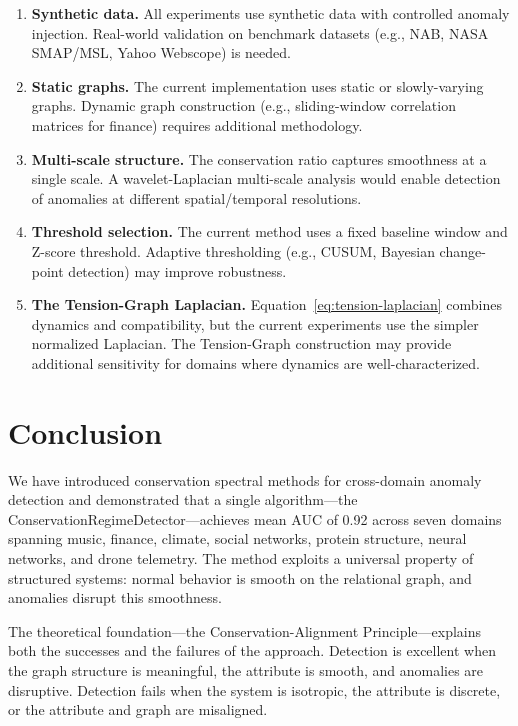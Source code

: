 \documentclass[11pt,a4paper]{article}
\begin{document}
\begin{enumerate}
  \item \textbf{Synthetic data.} All experiments use synthetic data with
        controlled anomaly injection.  Real-world validation on benchmark
        datasets (e.g., NAB, NASA SMAP/MSL, Yahoo Webscope) is needed.
  \item \textbf{Static graphs.} The current implementation uses static or
        slowly-varying graphs.  Dynamic graph construction (e.g., sliding-window
        correlation matrices for finance) requires additional methodology.
  \item \textbf{Multi-scale structure.} The conservation ratio captures smoothness
        at a single scale.  A wavelet-Laplacian multi-scale analysis would
        enable detection of anomalies at different spatial/temporal resolutions.
  \item \textbf{Threshold selection.} The current method uses a fixed baseline
        window and Z-score threshold.  Adaptive thresholding (e.g., CUSUM,
        Bayesian change-point detection) may improve robustness.
  \item \textbf{The Tension-Graph Laplacian.} Equation~\eqref{eq:tension-laplacian}
        combines dynamics and compatibility, but the current experiments use
        the simpler normalized Laplacian.  The Tension-Graph construction may
        provide additional sensitivity for domains where dynamics are well-characterized.
\end{enumerate}

\section{Conclusion}\label{sec:conclusion}

We have introduced conservation spectral methods for cross-domain anomaly
detection and demonstrated that a single algorithm---the
ConservationRegimeDetector---achieves mean AUC of 0.92 across seven domains
spanning music, finance, climate, social networks, protein structure, neural
networks, and drone telemetry.  The method exploits a universal property of
structured systems: normal behavior is smooth on the relational graph, and
anomalies disrupt this smoothness.

The theoretical foundation---the Conservation-Alignment Principle---explains
both the successes and the failures of the approach.  Detection is excellent
when the graph structure is meaningful, the attribute is smooth, and anomalies
are disruptive.  Detection fails when the system is isotropic, the attribute
is discrete, or the attribute and graph are misaligned.
\end{document}
